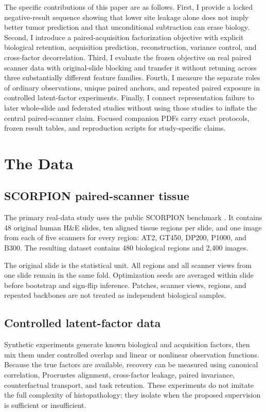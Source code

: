 \documentclass[10pt]{article}
\begin{document}
The specific contributions of this paper are as follows. First, I provide a locked negative-result sequence showing that lower site leakage alone does not imply better tumor prediction and that unconditional subtraction can erase biology. Second, I introduce a paired-acquisition factorization objective with explicit biological retention, acquisition prediction, reconstruction, variance control, and cross-factor decorrelation. Third, I evaluate the frozen objective on real paired scanner data with original-slide blocking and transfer it without retuning across three substantially different feature families. Fourth, I measure the separate roles of ordinary observations, unique paired anchors, and repeated paired exposure in controlled latent-factor experiments. Finally, I connect representation failure to later whole-slide and federated studies without using those studies to inflate the central paired-scanner claim. Focused companion PDFs carry exact protocols, frozen result tables, and reproduction scripts for study-specific claims.



\section{The Data}
\subsection{SCORPION paired-scanner tissue}
The primary real-data study uses the public SCORPION benchmark \citep{ryu2025scorpion}. It contains 48 original human H\&E slides, ten aligned tissue regions per slide, and one image from each of five scanners for every region: AT2, GT450, DP200, P1000, and B300. The resulting dataset contains 480 biological regions and 2,400 images.

The original slide is the statistical unit. All regions and all scanner views from one slide remain in the same fold. Optimization seeds are averaged within slide before bootstrap and sign-flip inference. Patches, scanner views, regions, and repeated backbones are not treated as independent biological samples.

\subsection{Controlled latent-factor data}
Synthetic experiments generate known biological and acquisition factors, then mix them under controlled overlap and linear or nonlinear observation functions. Because the true factors are available, recovery can be measured using canonical correlation, Procrustes alignment, cross-factor leakage, paired invariance, counterfactual transport, and task retention. These experiments do not imitate the full complexity of histopathology; they isolate when the proposed supervision is sufficient or insufficient.
\end{document}
